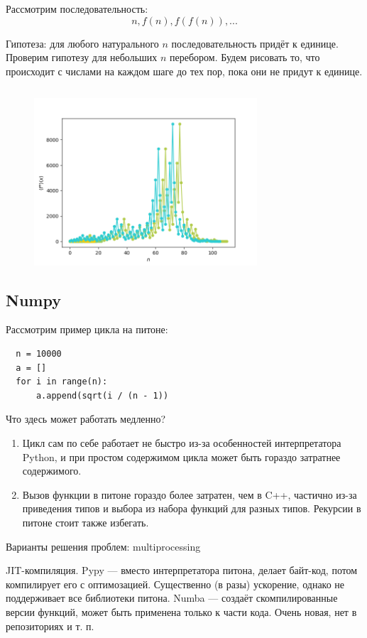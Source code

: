 \documentclass{book}
\begin{document}
Рассмотрим последовательность:
\begin{equation}
  n, f(n), f(f(n)), ...
\end{equation}

Гипотеза: для любого натурального $n$ последовательность придёт к единице.
Проверим гипотезу для небольших $n$ перебором. Будем рисовать то, что происходит с числами на
каждом шаге до тех пор, пока они не придут к единице.

\inputminted{python}{collatz.py}

\begin{figure}[p]
  \centering
  \includegraphics[width=8.3cm]{collatz.png}
\end{figure}

\subsection{Numpy}

Рассмотрим пример цикла на питоне:
\begin{verbatim}
  n = 10000
  a = []
  for i in range(n):
      a.append(sqrt(i / (n - 1))
\end{verbatim}
Что здесь может работать медленно?
\begin{enumerate}
    \item Цикл сам по себе работает не быстро из-за особенностей интерпретатора
        Python, и при простом содержимом цикла может быть гораздо затратнее
        содержимого.
    \item Вызов функции в питоне гораздо более затратен, чем в C++, частично
        из-за приведения типов и выбора из набора функций для разных типов.
        Рекурсии в питоне стоит также избегать.
\end{enumerate}

Варианты решения проблем: multiprocessing

JIT-компиляция. Pypy --- вместо интерпретатора питона,
делает байт-код, потом компилирует его с оптимозацией. Существенно (в разы)
ускорение, однако не поддерживает все библиотеки питона. Numba --- создаёт
скомпилированные версии функций, может быть применена только к части кода. Очень
новая, нет в репозиториях и т. п.
\end{document}
